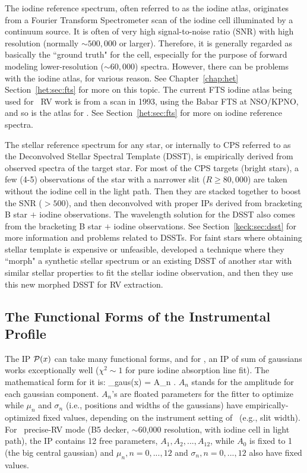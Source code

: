The iodine reference spectrum, often referred to as the iodine atlas,
originates from a Fourier Transform Spectrometer scan of the iodine
cell illuminated by a continuum source. It is often of very high
signal-to-noise ratio (SNR) with high resolution (normally $\sim
500,000$ or larger). Therefore, it is generally regarded as basically
the ``ground truth" for the cell, especially for the purpose of
forward modeling lower-resolution ($\sim 60,000$) spectra. However,
there can be problems with the iodine atlas, for various reason. See
Chapter~\ref{chap:het} Section~\ref{het:sec:fts} for more on this
topic. The current FTS iodine atlas being used for \keck\ RV work is
from a scan in 1993, using the Babar FTS at NSO/KPNO, and so is the
atlas for \het. See Section~\ref{het:sec:fts} for more on iodine
reference spectra.

The stellar reference spectrum for any star, or internally to CPS
referred to as the Deconvolved Stellar Spectral Template (DSST), is
empirically derived from observed spectra of the target star. For most
of the CPS targets (bright stars), a few (4-5) observations of the
star with a narrower slit ($R \geq 80,000$) are taken without the
iodine cell in the light path. Then they are stacked together to boost
the SNR ($>500$), and then deconvolved with proper IPs derived from
bracketing B star $+$ iodine observations. The wavelength solution for
the DSST also comes from the bracketing B star $+$ iodine
observations. See Section~\ref{keck:sec:dsst} for more information and
problems related to DSSTs. For faint stars where obtaining stellar
template is expensive or unfeasible, \cite{2006ApJ...647..600J}
developed a technique where they ``morph" a synthetic stellar spectrum
or an existing DSST of another star with similar stellar properties to
fit the stellar iodine observation, and then they use this new morphed
DSST for RV extraction.


\subsection{The Functional Forms of the Instrumental Profile}\label{doppler:sec:ip}

The IP $\mathcal{P}(x)$ can take many functional forms, and for \keck, an IP of sum of
gaussians works exceptionally well ($\chi^2 \sim 1$ for pure iodine
absorption line fit). The mathematical form for it is:
\beq
\curlyp_{\rm gaus}(x) = \sum A_n . 
\eeq
$A_n$ stands for the amplitude for each gaussian component. $A_n$'s
are floated parameters for the fitter to optimize while $\mu_n$ and
$\sigma_n$ (i.e., positions and widths of the gaussians) have
empirically-optimized fixed values, depending on the instrument
setting of \keck\ (e.g., slit width). For \keck\ precise-RV mode (B5
decker, $\sim$60,000 resolution, with iodine cell in light path), the
IP contains 12 free parameters, $A_1, A_2, ..., A_{12}$, while $A_0$
is fixed to 1 (the big central gaussian) and $\mu_n, n=0,...,12$ and
$\sigma_n, n=0,...,12$ also have fixed values.

